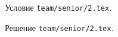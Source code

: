 \problem
Условие \texttt{team/senior/2.tex}.

\solution Решение \texttt{team/senior/2.tex}.
\endproblem
